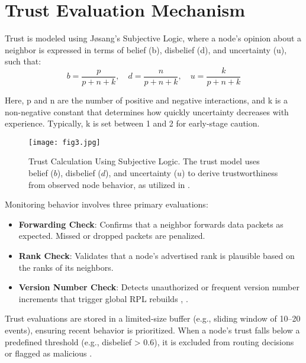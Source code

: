 \documentclass[final,5p,times,twocolumn]{elsarticle}
\begin{document}
\section{Trust Evaluation Mechanism}
Trust is modeled using Jøsang’s Subjective Logic, where a node’s opinion about a neighbor is expressed in terms of belief (b), disbelief (d), and uncertainty (u), such that:
\begin{equation}
 b = \frac{p}{p + n + k}, \quad d = \frac{n}{p + n + k}, \quad u = \frac{k}{p + n + k}
\end{equation}

Here, p and n are the number of positive and negative interactions, and k is a non-negative constant that determines how quickly uncertainty decreases with experience. Typically, k is set between 1 and 2 for early-stage caution.

\begin{figure}[htbp]
    \centering
    \texttt{[image: fig3.jpg]} 
    \caption{Trust Calculation Using Subjective Logic. The trust model uses belief ($b$), disbelief ($d$), and uncertainty ($u$) to derive trustworthiness from observed node behavior, as utilized in \cite{Khan2017}.}
    \label{fig:subjective_logic}
\end{figure}
Monitoring behavior involves three primary evaluations:
\begin{itemize}
  \item {\textbf{Forwarding Check}}:
  {\normalsize Confirms that a neighbor forwards data packets as expected. Missed or dropped packets are penalized.}
  \item {\textbf{Rank Check}}:
  {\normalsize Validates that a node's advertised rank is plausible based on the ranks of its neighbors.}
  \item {\textbf{Version Number Check}}:
  {\normalsize Detects unauthorized or frequent version number increments that trigger global RPL rebuilds \cite{Medjek2017}, \cite{Ioulianou2022}.}
\end{itemize}

Trust evaluations are stored in a limited-size buffer (e.g., sliding window of 10–20 events), ensuring recent behavior is prioritized. When a node’s trust falls below a predefined threshold (e.g., disbelief > 0.6), it is excluded from routing decisions or flagged as malicious \cite{Khan2017}.
\end{document}
